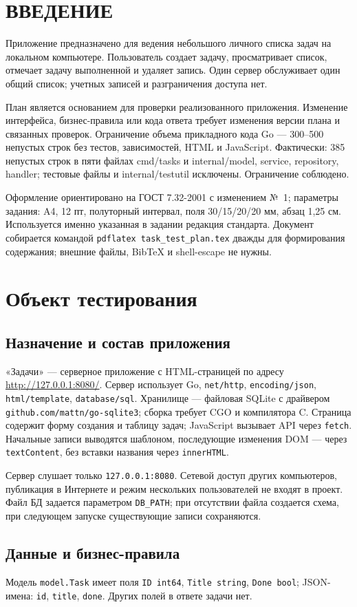 \documentclass[12pt,a4paper]{extarticle}
\newcommand{\code}[1]{\nolinkurl{#1}}
\newcommand{\struct}[1]{%
  \clearpage\begingroup
  \titlespacing*{\section}{0pt}{0pt}{18pt}%
  \section*{\centering #1}\endgroup%
  \addcontentsline{toc}{section}{#1}}
\newcommand{\mainsection}[1]{\clearpage\section{#1}}
\begin{document}
\struct{ВВЕДЕНИЕ}
Приложение предназначено для ведения небольшого личного списка задач
на локальном компьютере. Пользователь создает задачу, просматривает список,
отмечает задачу выполненной и удаляет запись. Один сервер обслуживает один
общий список; учетных записей и разграничения доступа нет.

План является основанием для проверки реализованного приложения. Изменение интерфейса,
бизнес-правила или кода ответа требует изменения версии плана и связанных
проверок. Ограничение объема прикладного кода Go --- 300--500 непустых строк
без тестов, зависимостей, HTML и JavaScript. Фактически: 385 непустых строк
в пяти файлах cmd/tasks и internal/model, service, repository, handler;
тестовые файлы и internal/testutil исключены. Ограничение соблюдено.

Оформление ориентировано на ГОСТ 7.32-2001 с изменением №~1;
параметры задания: A4, 12 пт, полуторный интервал, поля 30/15/20/20 мм,
абзац 1,25 см. Используется именно указанная в задании редакция стандарта.
Документ собирается командой \code{pdflatex task_test_plan.tex} дважды
для формирования содержания; внешние файлы, BibTeX и shell-escape не нужны.

\mainsection{Объект тестирования}
\subsection{Назначение и состав приложения}
«Задачи» --- серверное приложение с HTML-страницей по адресу
\url{http://127.0.0.1:8080/}. Сервер использует Go, \code{net/http},
\code{encoding/json}, \code{html/template}, \code{database/sql}.
Хранилище --- файловая SQLite с драйвером
\code{github.com/mattn/go-sqlite3}; сборка требует CGO и компилятора C.
Страница содержит форму создания и таблицу задач; JavaScript вызывает API
через \code{fetch}. Начальные записи выводятся шаблоном, последующие изменения
DOM --- через \code{textContent}, без вставки названия через \code{innerHTML}.

Сервер слушает только \code{127.0.0.1:8080}. Сетевой доступ других компьютеров,
публикация в Интернете и режим нескольких пользователей не входят в проект.
Файл БД задается параметром \code{DB_PATH}; при отсутствии файла создается
схема, при следующем запуске существующие записи сохраняются.

\subsection{Данные и бизнес-правила}
Модель \code{model.Task} имеет поля \code{ID int64}, \code{Title string},
\code{Done bool}; JSON-имена: \code{id}, \code{title}, \code{done}.
Других полей в ответе задачи нет.
\end{document}

